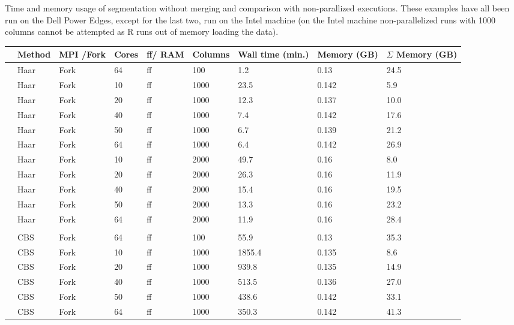 \documentclass[a4paper,11pt]{article}
\newcounter{magicrownumbers}
\newcommand\rownumber{\stepcounter{magicrownumbers}\arabic{magicrownumbers}}
\begin{document}
\begin{center}
\begin{threeparttable}
  \caption[Time and memory usage of segmentation: comparison with
  non-parallized executions.]{Time and memory usage of segmentation
    without merging and comparison with non-parallized executions. These
    examples have all been run on the Dell Power Edges, except for the
    last two, run on the Intel machine (on the Intel machine
    non-parallelized runs with 1000 columns cannot be attempted as R runs
    out of memory loading the data).}
\label{nonparall}
  \begin{tabular}{lp{1.3cm}p{1.2cm}p{1.0cm}p{0.85cm}p{1.2cm}p{1.9cm}p{1.55cm}p{1.8cm}}

    \hline\hline

&Method& MPI /Fork & Cores & ff/ RAM & Columns & Wall time (min.) & Memory
(GB)& $\Sigma$ Memory (GB)\\

\hline
\rownumber&Haar & Fork &64  & ff & 100 & 1.2   &   0.13  &  24.5  \\
\rownumber&Haar & Fork &10  & ff & 1000 &23.5 & 0.142 & 5.9 \\
\rownumber&Haar & Fork &20 & ff & 1000 & 12.3 & 0.137 & 10.0 \\
\rownumber&Haar & Fork &40  & ff & 1000 & 7.4 & 0.142 & 17.6 \\
\rownumber&Haar & Fork &50  & ff & 1000 & 6.7 & 0.139 & 21.2 \\
\rownumber&Haar & Fork & 64  & ff & 1000 & 6.4 & 0.142 & 26.9 \\


\rownumber&Haar & Fork &10  & ff & 2000 &49.7 & 0.16 & 8.0 \\
\rownumber&Haar & Fork &20  & ff & 2000 & 26.3 & 0.16 & 11.9 \\
\rownumber&Haar & Fork &40  & ff & 2000 & 15.4& 0.16 & 19.5 \\
\rownumber&Haar & Fork &50  & ff & 2000 & 13.3& 0.16 & 23.2 \\
\rownumber&Haar & Fork &64  & ff & 2000 & 11.9& 0.16 & 28.4 \\


&&&&&&&\\
\rownumber&CBS    & Fork & 64 & ff  & 100  & 55.9  &   0.13   &  35.3  \\
\rownumber&CBS & Fork &10  & ff & 1000 &1855.4 & 0.135 & 8.6 \\
\rownumber&CBS & Fork &20 & ff & 1000 & 939.8 & 0.135 & 14.9 \\
\rownumber&CBS & Fork &40  & ff & 1000 & 513.5 & 0.136 & 27.0 \\
\rownumber&CBS & Fork &50  & ff & 1000 & 438.6 & 0.142 & 33.1 \\
\rownumber&CBS & Fork & 64  & ff & 1000 & 350.3 & 0.142 & 41.3 \\


\end{tabular}
\end{threeparttable}
\end{center}
\end{document}
